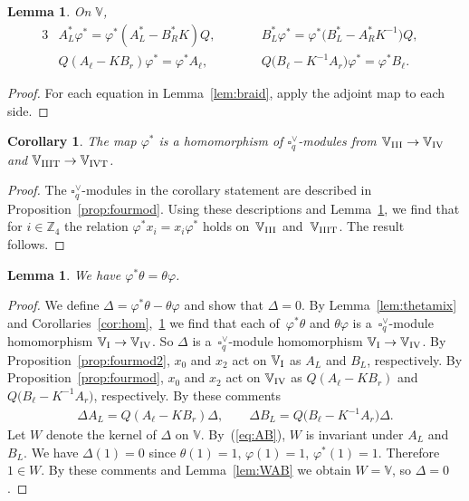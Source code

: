 \documentclass[pdftex]{sigma}
\numberwithin{equation}{section}
\newtheorem{Corollary}[Theorem]{Corollary}
\newtheorem{Lemma}[Theorem]{Lemma}
\begin{document}
\begin{Lemma}\label{lem:braiddual}On $\mathbb V$,
\begin{alignat*}{3}
& A^*_L\varphi^*=\varphi^*(A^*_L- B^*_R K)Q,\qquad &&
B^*_L \varphi^*=\varphi^* \big(B^*_L-A^*_R K^{-1}\big)Q, &\\ %
&Q(A_\ell-K B_r ) \varphi^*=\varphi^*A_\ell,\qquad && Q\big(B_\ell- K^{-1}A_r\big)
\varphi^*=\varphi^*B_\ell.&%
\end{alignat*}
\end{Lemma}
\begin{proof}For each equation in Lemma~\ref{lem:braid}, apply the adjoint map to each side.
\end{proof}

\begin{Corollary}\label{cor:hom2}The map $\varphi^*$ is a homomorphism of $\square^\vee_q$-modules from
 $\mathbb V_{\rm III} \to \mathbb V_{\rm IV}$ and $\mathbb V_{\rm IIIT} \to \mathbb V_{\rm IVT}$.
\end{Corollary}
\begin{proof}The $\square^\vee_q$-modules in the corollary statement are described in Proposition~\ref{prop:fourmod}. Using these descriptions and Lemma~\ref{lem:braiddual}, we find that for $i \in \mathbb Z_4$ the relation $ \varphi^* x_i = x_i \varphi^*$ holds on~$\mathbb V_{\rm III}$ and~$\mathbb V_{\rm IIIT}$. The result follows.
\end{proof}

\begin{Lemma}\label{lem:thphi}We have $\varphi^* \theta = \theta \varphi$.
\end{Lemma}
\begin{proof}We define $\Delta = \varphi^* \theta-\theta \varphi$ and show that $\Delta=0$. By Lemma~\ref{lem:thetamix} and Corolla\-ries~\ref{cor:hom},~\ref{cor:hom2} we find that each of~$\varphi^* \theta $ and $\theta \varphi $ is a~$\square^\vee_q$-module homomorphism $\mathbb V_{\rm I} \to \mathbb V_{\rm IV}$. So $\Delta$ is a~$\square^\vee_q$-module homomorphism $\mathbb V_{\rm I} \to \mathbb V_{\rm IV}$. By Proposition~\ref{prop:fourmod2}, $x_0$ and $x_2$ act on $\mathbb V_{\rm I}$ as $A_L$ and $B_L$, respectively. By Proposition~\ref{prop:fourmod}, $x_0$ and $x_2$ act on $\mathbb V_{\rm IV}$ as $Q (A_\ell-K B_r)$ and $Q \big(B_\ell-K^{-1} A_r\big)$, respectively. By these comments
\begin{gather}
\Delta A_L = Q (A_\ell-K B_r) \Delta,\qquad \Delta B_L = Q \big(B_\ell-K^{-1} A_r\big) \Delta.\label{eq:AB}
\end{gather}
Let $W$ denote the kernel of $\Delta$ on $\mathbb V$. By~(\ref{eq:AB}), $W$ is invariant under $A_L$ and $B_L$. We have $\Delta(1)=0$ since $\theta(1)=1$, $\varphi(1)=1$, $\varphi^*(1)=1$. Therefore $1 \in W$. By these comments and Lemma~\ref{lem:WAB} we obtain $W=\mathbb V$, so $\Delta=0$.
\end{proof}
\end{document}
